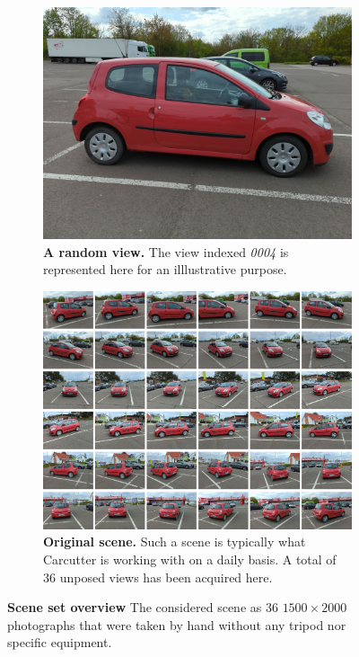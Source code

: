 \begin{figure}[htb!]
  \centering
  \begin{subfigure}[b]{0.45\linewidth}
    \includegraphics[width=\linewidth]{images/gaussiansplatting/gt/img-4.jpg}
    \caption{\textbf{A random view.} The view indexed \textit{0004} is represented here for an illlustrative purpose. }
    \label{fig:view-idx-4}
  \end{subfigure}
  \quad %
  \begin{subfigure}[b]{0.45\linewidth}
    \includegraphics[width=\linewidth]{images/gaussiansplatting/original_scene.png}
    \caption{\textbf{Original scene.} Such a scene is typically what Carcutter is working with on a daily basis. A total of 36 unposed views has been acquired here. }
    \label{fig:gs-original_scene}
  \end{subfigure}
  \caption{\textbf{Scene set overview} The considered scene as 36 $1500\times2000$ photographs that were taken by hand without any tripod nor specific equipment. }
  \label{fig:gs-scene-dataset}
\end{figure}

